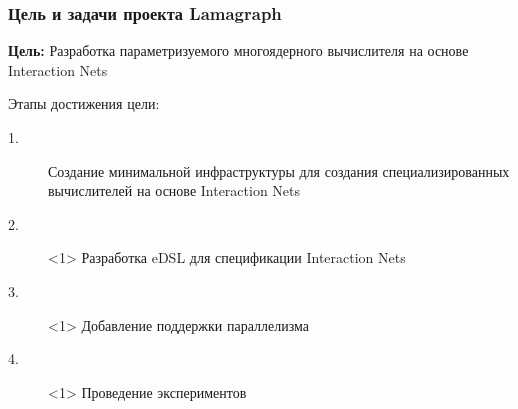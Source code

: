 \documentclass[aspectratio=169]{beamer}
\begin{document}
\begin{frame}
    \frametitle{Цель и задачи проекта Lamagraph}

    \textbf{Цель:} Разработка параметризуемого многоядерного вычислителя на основе Interaction Nets

    \vspace{2em}

    Этапы достижения цели:
    \begin{description}
        \item[ 1.] Создание минимальной инфраструктуры для создания специализированных вычислителей на основе Interaction Nets
        \item[2.]<1> Разработка eDSL для спецификации Interaction Nets
        \item[3.]<1> Добавление поддержки параллелизма
        \item[4.]<1> Проведение экспериментов
    \end{description}


\end{frame}
\end{document}
